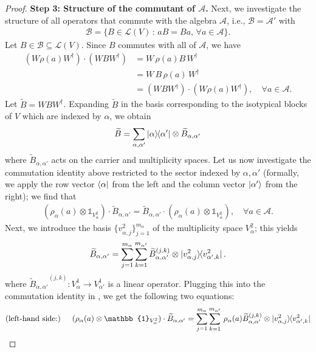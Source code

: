 \documentclass[12pt]{article}
\theoremstyle{plain}
\begin{document}
\begin{proof}
\textbf{Step 3: Structure of the commutant of $\mathcal{A}$.} Next, we investigate the structure of all operators that commute with the algebra $\mathcal{A}$, i.e., $\mathcal{B} = \mathcal{A}'$ with
\begin{align}
\mathcal{B} = \{B \in \mathcal{L}(V) \, : \, aB=Ba, \, \forall a \in \mathcal{A}\}.    
\end{align}
Let $B \in \mathcal{B} \subseteq \mathcal{L}(V)$. Since $B$ commutes with all of $\mathcal{A}$, we have
\begin{align}
(W \rho(a) W^\dag)\cdot(W B W^\dag) &= 
W \, \rho(a) B  \, W^\dag\\
&= 
W \, B \,\rho(a) \, W^\dag\\
&=(W B W^\dag) \cdot (W \rho(a) W^\dag), \quad \forall a \in \mathcal{A}.  
\end{align}
Let $\widetilde{B} = W B W^\dag$. Expanding $\widetilde{B}$ in the basis corresponding to the isotypical blocks of $V$ which are indexed by $\alpha$, we obtain
$$
\widetilde{B} = \sum_{\alpha,\alpha'} \ket{\alpha}\hspace{-1mm}\bra{\alpha'} \otimes \widetilde{B}_{\alpha,\alpha'}
$$
where $\widetilde{B}_{\alpha,\alpha'}$ acts on the carrier and multiplicity spaces. Let us now investigate the commutation identity above restricted to the sector indexed by $\alpha,\alpha'$ (formally, we apply the row vector $\bra{\alpha}$ from the left and the column vector $\ket{\alpha'}$ from the right); we find that
\begin{align}\label{eq:comm-id}
(\rho_{\alpha}(a) \otimes \mathbb{1}_{V_\alpha^2}) \cdot \widetilde{B}_{\alpha,\alpha'} = \widetilde{B}_{\alpha,\alpha'} \cdot (\rho_{\alpha}(a) \otimes \mathbb{1}_{V_\alpha^2}), \quad \forall a \in \mathcal{A}.
\end{align}
Next, we introduce the basis $\{v_{\alpha,j}^2\}_{j=1}^{m_\alpha}$ of the multiplicity space $V_\alpha^2$; this yields
\begin{align}
\widetilde{B}_{\alpha,\alpha'} = \sum_{j=1}^{m_\alpha} \sum_{k=1}^{m_{\alpha'}}   {\widetilde{B}_{\alpha,\alpha'}}^{(j,k)} \otimes \ket{v_{\alpha,j}^2} \hspace{-1mm}\bra{v_{\alpha',k}^2}.
\end{align}
where ${\widetilde{B}_{\alpha,\alpha'}}^{(j,k)}:V_\alpha^1 \rightarrow V_{\alpha'}^1$ is a linear operator. Plugging this into the commutation identity in , we get the following two equations:
\begin{align*}
\text{(left-hand side:) }  \quad (\rho_{\alpha}(a) \otimes \mathbb{1}_{V_\alpha^2}) \cdot \widetilde{B}_{\alpha,\alpha'} &= \sum_{j=1}^{m_\alpha} \sum_{k=1}^{m_{\alpha'}} \,  \rho_\alpha(a) {\widetilde{B}_{\alpha,\alpha'}}^{(j,k)} \otimes \ket{v_{\alpha,j}^2} \hspace{-1mm}\bra{v_{\alpha',k}^2}   \\

\end{align*}
\end{proof}
\end{document}
